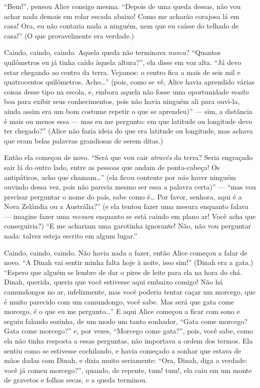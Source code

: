 ``Bem!'', pensou Alice consigo mesma. ``Depois de uma queda dessas, não
vou achar nada demais em rolar escada abaixo! Como me acharão corajosa
lá em casa! Ora, eu não contaria nada a ninguém, nem que eu caísse do
telhado de casa!'' (O que provavelmente era verdade.)

Caindo, caindo, caindo. Aquela queda não terminava \emph{nunca}?
``Quantos quilômetros eu já tinha caído àquela altura?'', ela disse em
voz alta. ``Já devo estar chegando ao centro da terra. Vejamos: o centro
fica a mais de seis mil e quatrocentos quilômetros. Acho\ldots{}'' (pois,
como se vê, Alice havia aprendido várias coisas desse tipo na escola, e,
embora aquela não fosse uma oportunidade \emph{muito} boa para exibir
seus conhecimentos, pois não havia ninguém ali para ouvi-la, ainda assim
era um bom costume repetir o que se aprendeu)'' --- sim, a distância é
mais ou menos essa --- mas eu me pergunto: em que latitude ou longitude
devo ter chegado?'' (Alice não fazia ideia do que era latitude ou
longitude, mas achava que eram belas palavras grandiosas de serem
ditas.)

Então ela começou de novo. ``Será que vou cair \emph{através} da terra?
Seria engraçado sair lá do outro lado, entre as pessoas que andam de
ponta-cabeça! Os antipáticos, acho que chamam\ldots{}'' (ela ficou contente
por \emph{não} haver ninguém ouvindo dessa vez, pois não parecia mesmo
ser essa a palavra certa)'' --- ``mas vou precisar perguntar o nome do
país, sabe como é\ldots{} Por favor, senhora, aqui é a Nova Zelândia ou a
Austrália?'' (e ela tentou fazer uma mesura enquanto falava --- imagine
fazer uma \emph{mesura} enquanto se está caindo em plano ar! Você acha
que conseguiria?) ``E me achariam uma garotinha ignorante! Não, não vou
perguntar nada: talvez esteja escrito em algum lugar.''

Caindo, caindo, caindo. Não havia nada a fazer, então Alice começou a
falar de novo. ``A Dinah vai sentir minha falta hoje à noite, isso
sim!'' (Dinah era a gata.) ``Espero que alguém se lembre de dar o pires de
leite para ela na hora do chá. Dinah, querida, queria que você estivesse
aqui embaixo comigo! Não há camundongos no ar, infelizmente, mas você
poderia tentar caçar um morcego, que é muito parecido com um camundongo,
você sabe. Mas será que gata come morcego, é o que eu me pergunto\ldots{}'' E
aqui Alice começou a ficar com sono e seguiu falando sozinha, de um
modo um tanto sonhador, ``Gata come morcego? Gata come morcego?'' e, por
vezes, ``Morcego come gata?'', pois, você sabe, como ela não tinha
resposta a essas perguntas, não importava a ordem dos termos. Ela sentiu
como se estivesse cochilando, e havia começado a sonhar que estava de
mãos dadas com Dinah, e dizia muito seriamente: ``Ora, Dinah, diga a
verdade: você já comeu morcego?'', quando, de repente, tum! tum!, ela
caiu em um monte de gravetos e folhas secas, e a queda terminou.

